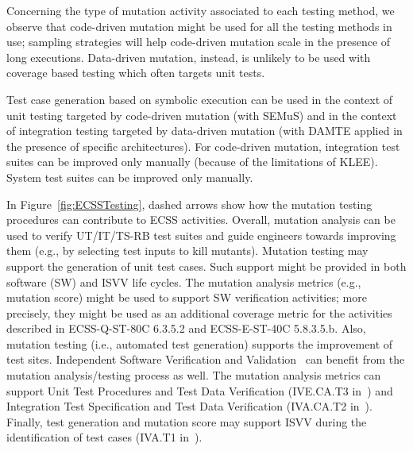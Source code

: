 Concerning the type of mutation activity associated to each testing method, we observe that code-driven mutation might be used for all the testing methods in use; sampling strategies will help code-driven mutation scale in the presence of long executions. Data-driven mutation, instead, is unlikely to be used with coverage based testing which often targets unit tests. 

Test case generation based on symbolic execution can be used in the context of unit testing targeted by code-driven mutation (with SEMuS) and in the context of integration testing targeted by data-driven mutation (with DAMTE applied in the presence of specific architectures). For code-driven mutation, integration test suites can be improved only manually (because of the limitations of KLEE). System test suites can be improved only manually.

In Figure~\ref{fig:ECSSTesting}, dashed arrows show how the mutation testing procedures can contribute to ECSS activities. 
Overall, mutation analysis can be used to verify UT/IT/TS-RB test suites and guide engineers towards improving them (e.g., by selecting test inputs to kill mutants). Mutation testing may support the generation of unit test cases. Such support might be provided in both software (SW) and ISVV life cycles. 
The mutation analysis metrics (e.g., mutation score) might be used to support SW verification activities; more precisely, they might be used as an additional coverage metric for the activities described in ECSS-Q-ST-80C 6.3.5.2 and ECSS-E-ST-40C 5.8.3.5.b. Also, mutation testing (i.e., automated test generation) supports the improvement of test sites. Independent Software Verification and Validation~\cite{ESAISVV} can benefit from the mutation analysis/testing process as well. The mutation analysis metrics can support Unit Test Procedures and Test Data Verification (IVE.CA.T3 in~\cite{ESAISVV}) and Integration Test Specification and Test Data Verification (IVA.CA.T2 in~\cite{ESAISVV}). Finally, test generation and mutation score may support ISVV during the identification of test cases (IVA.T1 in~\cite{ESAISVV}).
